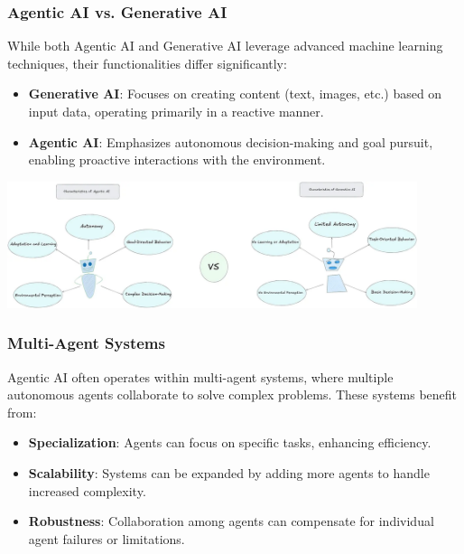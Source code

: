 \subsubsection{Agentic AI vs. Generative AI}
While both Agentic AI and Generative AI leverage advanced machine learning techniques, their functionalities differ significantly:

\begin{itemize}
    \item \textbf{Generative AI}: Focuses on creating content (text, images, etc.) based on input data, operating primarily in a reactive manner.
    \item \textbf{Agentic AI}: Emphasizes autonomous decision-making and goal pursuit, enabling proactive interactions with the environment.
\end{itemize}

\begin{center}
    \centering
    \includegraphics[width=0.9\textwidth]{Images/agentic_vs_generative_ai.png}
     \cite{agenticAIvsGenerativeAI}
    \label{fig:agentic_vs_generative_ai}
\end{center}

\subsubsection{Multi-Agent Systems}
Agentic AI often operates within multi-agent systems, where multiple autonomous agents collaborate to solve complex problems. These systems benefit from:

\begin{itemize}
    \item \textbf{Specialization}: Agents can focus on specific tasks, enhancing efficiency.
    \item \textbf{Scalability}: Systems can be expanded by adding more agents to handle increased complexity.
    \item \textbf{Robustness}: Collaboration among agents can compensate for individual agent failures or limitations.
\end{itemize}

